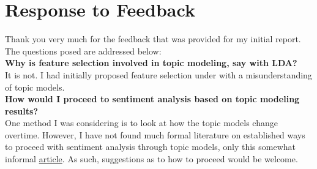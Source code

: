 \documentclass[12pt]{article}
\begin{document}
\section{Response to Feedback}
Thank you very much for the feedback that was provided for my initial report.
The questions posed are addressed below:
\textbf{\\Why is feature selection involved in topic modeling, say with LDA?\\}
It is not. I had initially proposed feature selection under with a misunderstanding
of topic models.\\
\textbf{How would I proceed to sentiment analysis based on topic modeling results?\\}
One method I was considering is to look at how the topic models
change overtime. However, I have not found much formal literature on
established ways to proceed with sentiment analysis through topic models, only
this somewhat informal \href{https://blog.insightdatascience.com/topic-modeling-and-sentiment-analysis-to-pinpoint-the-perfect-doctor-6a8fdd4a3904}{article}.
As such, suggestions as to how to proceed would be welcome.
\end{document}
